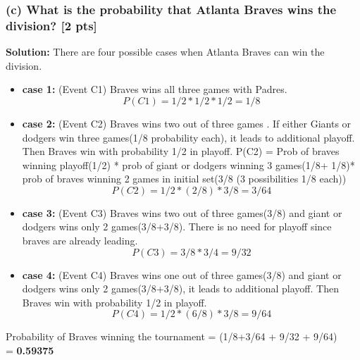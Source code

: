 \documentclass[twoside,10pt]{article}
\begin{document}
\subsubsection*{(c) What is the probability that Atlanta Braves wins the division? [2 pts]}
\textbf{ Solution: }	
There are four possible cases when Atlanta Braves can win the division.
\begin{itemize}
	\item \textbf{case 1:} (Event C1) Braves wins all three games with Padres.\\
   	\begin{equation*}\label{c1}
		P(C1) = 1/2*1/2*1/2 = 1/8 
	\end{equation*}
    \item \textbf{case 2:} (Event C2) Braves wins two out of three games . If either Giants or dodgers win three games(1/8 probability each), it leads to additional playoff. Then Braves win with probability 1/2 in playoff.
    P(C2) = Prob of braves winning playoff(1/2) * prob of giant or dodgers winning 3 games(1/8+ 1/8)* prob of braves winning 2 games in initial set(3/8 (3 possibilities 1/8 each))
   	\begin{equation*}\label{c2}
		P(C2) =  1/2*(2/8)*3/8 = 3/64
	\end{equation*}
    \item \textbf{case 3:} (Event C3) Braves wins two out of three games(3/8) and giant or dodgers wins only 2 games(3/8+3/8). There is no need for playoff since braves are already leading.
   	\begin{equation*}\label{c3}
		P(C3) =  3/8*3/4 = 9/32
	\end{equation*}
     \item \textbf{case 4:} (Event C4)  Braves wins one out of three games(3/8) and giant or dodgers wins only 2 games(3/8+3/8), it leads to additional playoff. Then Braves win with probability 1/2 in playoff.
   	\begin{equation*}\label{c4}
		P(C4) =  1/2*(6/8)*3/8 = 9/64
	\end{equation*}
\end{itemize}
Probability of Braves winning the tournament = (1/8+3/64 + 9/32 + 9/64)\\
= \textbf{0.59375}


\vspace{1cm}
\end{document}
